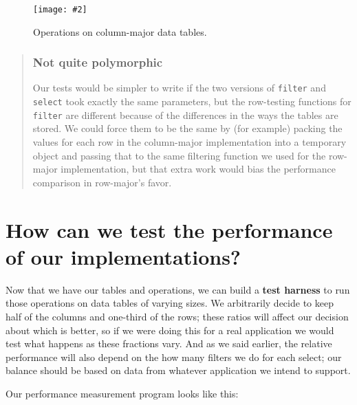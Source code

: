 \documentclass[krantzl]{krantz}
\newcommand{\figpdf}[4]{\begin{figure}%
\centering%
\texttt{[image: \#2]}%
\caption{#3}%
\label{#1}%
\end{figure}}
\newcommand{\glossref}[1]{\textbf{#1}}
\newenvironment{callout}{\savenotes\begin{tBox}\begin{quotation}\toggletrue{inbox}\renewcommand{\thempfootnote}{\arabic{footnote}}}{\end{quotation}\vspace{\baselineskip}\end{tBox}\togglefalse{inbox}\spewnotes}
\begin{document}
\figpdf{data-table-col-ops}{./data-table/col-ops.pdf}{Operations on column-major data tables.}{0.6}

\begin{callout}


\subsubsection*{Not quite polymorphic}


Our tests would be simpler to write if the two versions of \texttt{filter} and \texttt{select}
took exactly the same parameters,
but the row-testing functions for \texttt{filter} are different
because of the differences in the ways the tables are stored.
We could force them to be the same by (for example)
packing the values for each row in the column-major implementation
into a temporary object
and passing that to the same filtering function we used for the row-major implementation,
but that extra work would bias the performance comparison in row-major's favor.

\end{callout}

\section{How can we test the performance of our implementations?}\label{data-table-profile}


Now that we have our tables and operations,
we can build a \glossref{test harness} to run those operations
on data tables of varying sizes.
We arbitrarily decide to keep half of the columns and one-third of the rows;
these ratios will affect our decision about which is better,
so if we were doing this for a real application we would test what happens
as these fractions vary.
And as we said earlier,
the relative performance will also depend on the how many filters we do for each select;
our balance should be based on data from whatever application we intend to support.


Our performance measurement program looks like this:
\end{document}
